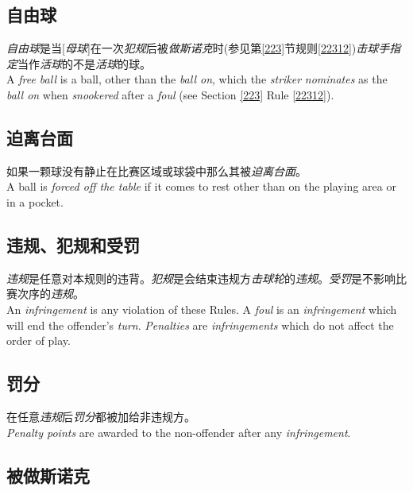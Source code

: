\subsection{自由球}

\noindent \emph{自由球}是当[\emph{母球}]在一次\emph{犯规}后被\emph{做斯诺克}时(参见第\ref{223}节规则\ref{22312})\emph{击球手}\emph{指定}当作\emph{活球}的不是\emph{活球}的球。\\
A \emph{free ball} is a ball, other than the \emph{ball on}, which the \emph{striker} \emph{nominates} as the \emph{ball on} when \emph{snookered} after a \emph{foul} (see Section \ref{223} Rule \ref{22312}).

\subsection{迫离台面}

\noindent 如果一颗球没有静止在比赛区域或球袋中那么其被\emph{迫离台面}。\\
A ball is \emph{forced off the table} if it comes to rest other than on the 
playing area or in a pocket.

\subsection{违规、犯规和受罚}

\noindent \emph{违规}是任意对本规则的违背。\emph{犯规}是会结束违规方\emph{击球轮}的\emph{违规}。\emph{受罚}是不影响比赛次序的\emph{违规}。\\
An \emph{infringement} is any violation of these Rules. A \emph{foul} is an \emph{infringement} which will end the offender's \emph{turn}. \emph{Penalties} are \emph{infringements} which do not affect the order of play.

\subsection{罚分}

\noindent 在任意\emph{违规}后\emph{罚分}都被加给非违规方。\\
\emph{Penalty points} are awarded to the non-offender after any \emph{infringement}.

\subsection{被做斯诺克}\label{22217}

